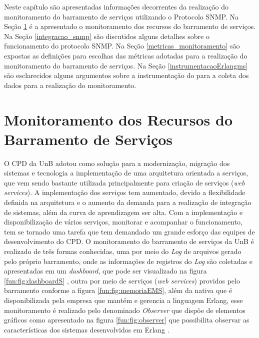 \label{monitoramento_servicos}

Neste capítulo são apresentadas informações decorrentes da realização do monitoramento do barramento de serviços utilizando o Protocolo \acrshort{SNMP}. Na Seção \ref{recursos_monitoramento} é a apresentado o monitoramento dos recursos do barramento de serviços. Na Seção \ref{integracao_snmp} são discutidos alguns detalhes sobre o funcionamento do protocolo \acrshort{SNMP}. Na Seção \ref{metricas_monitoramento} são expostas as definições para escolhas das métricas adotadas para a realização do monitoramento do barramento de serviços. Na Seção \ref{instrumentacaoErlangms} são esclarecidos alguns argumentos sobre a instrumentação do para a coleta dos dados para a realização do monitoramento.

\section{Monitoramento dos Recursos do Barramento de Serviços}%
\label{recursos_monitoramento}

O \acrshort{CPD} da \acrshort{UnB} adotou como solução para a modernização, migração dos sistemas e tecnologia a implementação de uma arquitetura orientada a serviços, que vem sendo bastante utilizada principalmente para criação de serviços (\textit{web services}). A implementação dos serviços tem aumentado, devido a flexibilidade definida na arquitetura e o aumento da demanda para a realização de integração de sistemas, além da curva de aprendizagem ser alta. Com a implementação e disponibilização de  vários serviços, monitorar e acompanhar o funcionamento, tem se tornado uma tarefa que tem demandado um grande esforço das equipes de 
desenvolvimento do \acrshort{CPD}. O monitoramento do barramento de serviços da \acrshort{UnB} é realizado de três formas conhecidas, uma por meio do \textit{Log} de arquivos gerado pelo próprio barramento, onde as informações de registros do \textit{Log} são coletadas e apresentadas em um \textit{dashboard}, que pode ser visualizado na figura \ref{fun:fig:dashboardS} \cite{filgueirasmonitoramento}, outra por meio de serviços (\textit{web services}) providos pelo barramento conforme a figura \ref{fun:fig:memoriaEMS}, além da nativa que é disponibilizada pela empresa que mantém e gerencia a linguagem Erlang, esse monitoramento é realizado pelo denominado \textit{Observer} que dispõe de elementos gráficos como apresentado na figura \ref{fun:fig:observer} que possibilita observar as características dos sistemas desenvolvidos em Erlang \cite{ericssonAB2002-2019}. 

